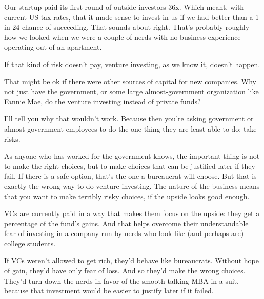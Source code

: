 Our startup paid its first round of outside
                  investors 36x. Which meant, with current US tax rates, that it
                  made sense to invest in us if we had better than a 1 in 24
                  chance of succeeding. That sounds about right. That's probably
                  roughly how we looked when we were a couple of nerds with no
                  business experience operating out of an apartment.

If
                  that kind of risk doesn't pay, venture investing, as we know
                  it, doesn't happen.

That might be ok if there were
                  other sources of capital for new companies. Why not just have
                  the government, or some large almost-government organization
                  like Fannie Mae, do the venture investing instead of private
                  funds?

I'll tell you why that wouldn't work.
                  Because then you're asking government or almost-government
                  employees to do the one thing they are least able to do: take
                  risks.

As anyone who has worked for the government
                  knows, the important thing is not to make the right choices,
                  but to make choices that can be justified later if they fail.
                  If there is a safe option, that's the one a bureaucrat will
                  choose. But that is exactly the wrong way to do venture
                  investing. The nature of the business means that you want to
                  make terribly risky choices, if the upside looks good
                  enough.

VCs are currently
                  \href{http://www.paulgraham.com/venturecapital.html}{paid} in a way that makes
                  them focus on the upside: they get a percentage of the fund's
                  gains. And that helps overcome their understandable fear of
                  investing in a company run by nerds who look like (and perhaps
                  are) college students.

If VCs weren't allowed to
                  get rich, they'd behave like bureaucrats. Without hope of
                  gain, they'd have only fear of loss. And so they'd make the
                  wrong choices. They'd turn down the nerds in favor of the
                  smooth-talking MBA in a suit, because that investment would be
                  easier to justify later if it failed.

